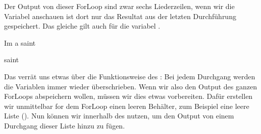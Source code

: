 \documentclass[letterpaper,10pt,english]{sphinxmanual}
\begin{document}
Der Output von dieser For\sphinxhyphen{}Loop sind zwar sechs Liederzeilen, wenn wir die Variabel  anschauen ist dort nur das Resultat aus der letzten Durchführung gespeichert. Das gleiche gilt auch für die variabel .

\begin{sphinxVerbatim}[commandchars=\\\{\}]
\end{sphinxVerbatim}

\begin{sphinxVerbatim}[commandchars=\\\{\}]
\PYGZdq{}I\PYGZsq{}m a saint\PYGZdq{}
\end{sphinxVerbatim}

\begin{sphinxVerbatim}[commandchars=\\\{\}]
\end{sphinxVerbatim}

\begin{sphinxVerbatim}[commandchars=\\\{\}]
\PYGZsq{}saint\PYGZsq{}
\end{sphinxVerbatim}

Das verrät uns etwas über die Funktionsweise des : Bei jedem Durchgang werden die Variablen immer wieder überschrieben. Wenn wir also den Output des ganzen For\sphinxhyphen{}Loops abspeichern wollen, müssen wir dies etwas vorbereiten.
Dafür erstellen wir unmittelbar for dem For\sphinxhyphen{}Loop einen leeren Behälter, zum Beispiel eine leere Liste (). Nun können wir innerhalb des   nutzen, um den Output von einem Durchgang dieser Liste hinzu zu fügen.

\begin{sphinxVerbatim}[commandchars=\\\{\}]
  \PYG{p}{[}\PYG{p}{]}

   \PYG{p}{[}\PYG{p}{]}
        
    
\end{sphinxVerbatim}
\end{document}
